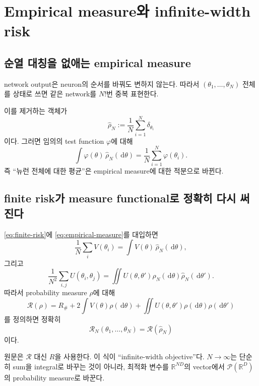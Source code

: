\documentclass[11pt,a4paper,oneside,openany]{memoir}
\newcommand{\R}{\mathbb{R}}
\newcommand{\Risk}{\mathcal{R}}
\newcommand{\dd}{\,\mathrm{d}}
\theoremstyle{definition}
\begin{document}
\chapter{Empirical measure와 infinite-width risk}
\begingroup
\setlength{\abovedisplayskip}{6pt plus 2pt minus 2pt}
\setlength{\belowdisplayskip}{6pt plus 2pt minus 2pt}
\setlength{\abovedisplayshortskip}{3pt plus 2pt}
\setlength{\belowdisplayshortskip}{4pt plus 2pt minus 1pt}
\setlength{\parskip}{0.36em}

\section{순열 대칭을 없애는 empirical measure}

network output은 neuron의 순서를 바꿔도 변하지 않는다. 따라서
$(\theta_1,\ldots,\theta_N)$ 전체를 상태로 쓰면 같은 network를 $N!$번 중복 표현한다.

이를 제거하는 객체가
\begin{equation}
\boxed{
  \hat\rho_N
  :=\frac1N\sum_{i=1}^{N}\delta_{\theta_i}
}
\label{eq:empirical-measure}
\end{equation}
이다. 그러면 임의의 test function $\varphi$에 대해
\[
  \int \varphi(\theta)\,\hat\rho_N(\dd\theta)
  =\frac1N\sum_{i=1}^N\varphi(\theta_i).
\]
즉 ``뉴런 전체에 대한 평균''은 empirical measure에 대한 적분으로 바뀐다.

\section{finite risk가 measure functional로 정확히 다시 써진다}

\eqref{eq:finite-risk}에 \eqref{eq:empirical-measure}를 대입하면
\[
  \frac1N\sum_iV(\theta_i)
  =\int V(\theta)\,\hat\rho_N(\dd\theta),
\]
그리고
\[
  \frac1{N^2}\sum_{i,j}U(\theta_i,\theta_j)
  =\iint U(\theta,\theta')
  \hat\rho_N(\dd\theta)\hat\rho_N(\dd\theta').
\]
따라서 probability measure $\rho$에 대해
\begin{equation}
\boxed{
\Risk(\rho)
=R_\#+2\int V(\theta)\rho(\dd\theta)
+\iint U(\theta,\theta')\rho(\dd\theta)\rho(\dd\theta')
}
\label{eq:measure-risk}
\end{equation}
를 정의하면 정확히
\[
  \Risk_N(\theta_1,\ldots,\theta_N)=\Risk(\hat\rho_N)
\]
이다.

\begin{paperbox}[--- Mei et al., Eq. (5)]
원문은 $\Risk$ 대신 $R$을 사용한다. 이 식이 ``infinite-width objective''다.
$N\to\infty$는 단순히 sum을 integral로 바꾸는 것이 아니라,
최적화 변수를 $\R^{ND}$의 vector에서 $\mathcal P(\R^D)$의 probability measure로 바꾼다.
\end{paperbox}
\end{document}
